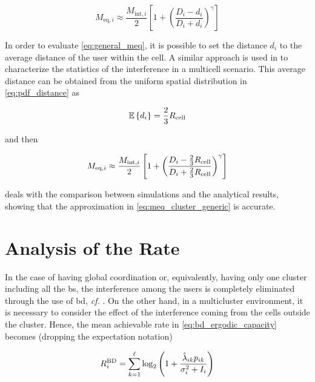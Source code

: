 \begin{equation} \label{eq:general_meq}
    M_{\text{eq}, i} \approx \frac{M_{\text{int}, i}}{2} \left[ 1 + \left(
    \frac{D_i - d_i}{D_i + d_i}\right)^\gamma\right]
\end{equation}

In order to evaluate \eqref{eq:general_meq}, it is possible to set the distance
$d_i$ to the average distance of the user within the cell. A similar approach is
used in \cite{pijcke11} to characterize the statistics of the interference in a
multicell scenario. This average distance can be obtained from the uniform
spatial distribution in \eqref{eq:pdf_distance} as

\begin{equation} \label{eq:average_distance}
    \mathbb{E}\left\{d_i\right\} = \frac{2}{3}R_{\text{cell}}
\end{equation}

\noindent
and then

\begin{equation} \label{eq:meq_cluster_generic}
    M_{\text{eq}, i} \approx \frac{M_{\text{int},i}}{2} \left[ 1 + \left(
        \frac{D_i - \frac{2}{3}R_{\text{cell}}}
        {D_i + \frac{2}{3}R_{\text{cell}}}\right)^\gamma\right]
\end{equation}

 deals with the comparison between simulations and
the analytical results, showing that the approximation in
\eqref{eq:meq_cluster_generic} is accurate.


\section{Analysis of the Rate}\label{sec:achiev_rate_analysis}

In the case of having global coordination or, equivalently, having only one
cluster including all the \gls{bs}, the interference among the users is
completely eliminated through the use of \gls{bd}, \emph{cf.} . On
the other hand, in a multicluster environment, it is necessary to consider the
effect of the interference coming from the cells outside the cluster. Hence, the
mean achievable rate in \eqref{eq:bd_ergodic_capacity} becomes (dropping the
expectation notation)

\begin{equation} \label{eq:rate_bd_interf}
    R_i^{\text{BD}} = \sum\limits_{k = 1}^{\ell} \log_2 \left(1 +
        \frac{\hat{\lambda}_{ik} p_{ik}}{\sigma_i^2 + I_i} \right)
\end{equation}

